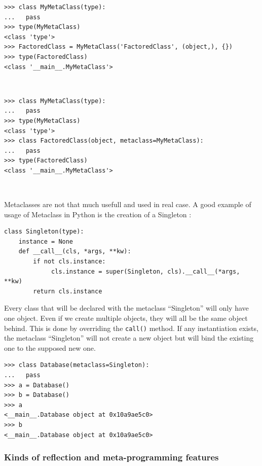 \documentclass[a4paper,10pt]{article}
\begin{document}
\begin{minipage}[c]{.5\linewidth}
\begin{lstlisting}[caption=Without syntaxic sugar]
>>> class MyMetaClass(type):
...   pass
>>> type(MyMetaClass)
<class 'type'>
>>> FactoredClass = MyMetaClass('FactoredClass', (object,), {})
>>> type(FactoredClass)
<class '__main__.MyMetaClass'>
\end{lstlisting}
~\\
\end{minipage} \hfill
\begin{minipage}[c]{.5\linewidth}
\begin{lstlisting}[caption=With syntaxic sugar]
>>> class MyMetaClass(type):
...   pass
>>> type(MyMetaClass)
<class 'type'>
>>> class FactoredClass(object, metaclass=MyMetaClass):
...   pass
>>> type(FactoredClass)
<class '__main__.MyMetaClass'>
\end{lstlisting}
~\\
\end{minipage}

Metaclasses are not that much usefull and used in real case. A good example of usage of Metaclass in Python is the creation of a Singleton :

\begin{lstlisting}
class Singleton(type):
    instance = None
    def __call__(cls, *args, **kw):
        if not cls.instance:
             cls.instance = super(Singleton, cls).__call__(*args, **kw)
        return cls.instance
\end{lstlisting}

Every class that will be declared with the metaclass ``Singleton'' will only have one object. Even if we create multiple objects, they will all be the same object behind. This is done by overriding the \lstinline|call()| method. If any instantiation exists, the metaclass ``Singleton'' will not create a new object but will bind the existing one to the supposed new one.

\begin{lstlisting}
>>> class Database(metaclass=Singleton):
...   pass
>>> a = Database()
>>> b = Database()
>>> a
<__main__.Database object at 0x10a9ae5c0>
>>> b
<__main__.Database object at 0x10a9ae5c0>
\end{lstlisting}


\subsubsection{Kinds of reflection and meta-programming features}
\end{document}
